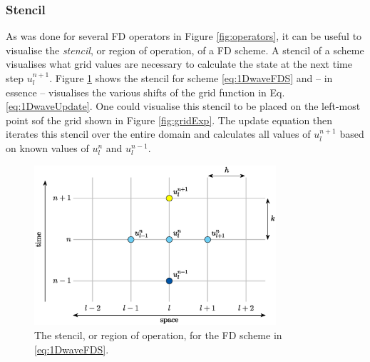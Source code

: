 \subsubsection{Stencil}
As was done for several FD operators in Figure \ref{fig:operators}, it can be useful to visualise the \textit{stencil}, or region of operation, of a FD scheme. A stencil of a scheme visualises what grid values are necessary to calculate the state at the next time step $u_l^{n+1}$. Figure \ref{fig:stencil1DWave} shows the stencil for scheme \eqref{eq:1DwaveFDS} and -- in essence -- visualises the various shifts of the grid function in Eq. \eqref{eq:1DwaveUpdate}. One could visualise this stencil to be placed on the left-most point sof the grid shown in Figure \ref{fig:gridExp}. The update equation then iterates this stencil over the entire domain and calculates all values of $u_l^{n+1}$ based on known values of $u_l^n$ and $u_l^{n-1}$.

\begin{figure}[h]
    \centering
    \includegraphics[width=0.8\textwidth]{figures/fdtd/1DWaveStencil.eps}
    \caption{The stencil, or region of operation, for the FD scheme in \eqref{eq:1DwaveFDS}.\label{fig:stencil1DWave}}
\end{figure}

